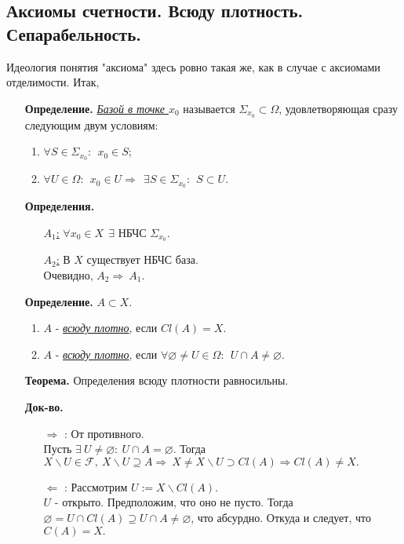 \documentclass[10pt]{report}
\begin{document}
\begin{spacing}{1.5}
\section{Аксиомы счетности. Всюду плотность. Сепарабельность.}
Идеология понятия "аксиома" здесь ровно такая же, как в случае с аксиомами отделимости. Итак,\\
\begin{enumerate}
\item[\textbf{Определение.}]
\emph{\underline{Базой в точке $x_{0}$}} называется $\Sigma_{x_{0}}\subset\Omega$, удовлетворяющая сразу следующим двум условиям:
\begin{enumerate}
\item $\forall S\in \Sigma_{x_{0}}:~~x_{0}\in S$;
\item $\forall U\in \Omega:~~x_{0}\in U\Longrightarrow~~\exists S \in \Sigma_{x_{0}}:~~S\subset U.$
\end{enumerate}
\item[\textbf{Определения.}]
\begin{enumerate}
\item[\underline{$A_{1}$:}] $\forall x_{0}\in X~~\exists $ НБЧС $\Sigma_{x_{0}}.$
\item[\underline{$A_{2}$:}] В $X$ существует НБЧС база.
\\Очевидно, $A_{2}\Rightarrow~A_{1}.$
\end{enumerate}
\item[\textbf{Определение.}] $A\subset X.$
\begin{enumerate}
\item $A$ - \emph{\underline{всюду плотно}}, если $Cl(A)=X.$
\item $A$ - \emph{\underline{всюду плотно}}, если $\forall\varnothing\neq U\in\Omega:~~U\cap A\neq \varnothing.$
\end{enumerate}
\item[\textbf{Теорема.}] Определения всюду плотности равносильны.
\item[\textbf{Док-во.}]
\begin{enumerate}
\item[\underline{$\Rightarrow$}]: От противного.\\
Пусть $\exists~ U\neq\varnothing:~ U\cap A=\varnothing.$ Тогда $X\backslash U\in \mathcal{F},~X\backslash  U\supseteq A\Longrightarrow~X\neq X\backslash U\supset Cl(A)\Longrightarrow Cl(A)\neq X.$
\item[\underline{$\Leftarrow$}]: Рассмотрим $U:=X\backslash Cl(A).$\\
$U$ - открыто. Предположим, что оно не пусто. Тогда $\varnothing=U\cap Cl(A)\supseteq U\cap A\neq\varnothing$, что абсурдно. Откуда и следует, что $C(A)=X.$

\end{enumerate}
\end{enumerate}
\end{spacing}
\end{document}

